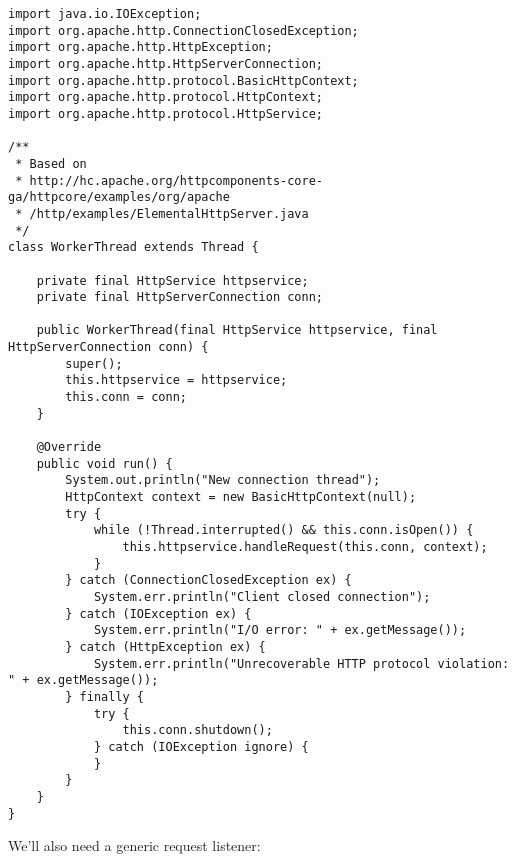 \begin{lstlisting}
import java.io.IOException;
import org.apache.http.ConnectionClosedException;
import org.apache.http.HttpException;
import org.apache.http.HttpServerConnection;
import org.apache.http.protocol.BasicHttpContext;
import org.apache.http.protocol.HttpContext;
import org.apache.http.protocol.HttpService;

/**
 * Based on
 * http://hc.apache.org/httpcomponents-core-ga/httpcore/examples/org/apache
 * /http/examples/ElementalHttpServer.java
 */
class WorkerThread extends Thread {

	private final HttpService httpservice;
	private final HttpServerConnection conn;

	public WorkerThread(final HttpService httpservice, final HttpServerConnection conn) {
		super();
		this.httpservice = httpservice;
		this.conn = conn;
	}

	@Override
	public void run() {
		System.out.println("New connection thread");
		HttpContext context = new BasicHttpContext(null);
		try {
			while (!Thread.interrupted() && this.conn.isOpen()) {
				this.httpservice.handleRequest(this.conn, context);
			}
		} catch (ConnectionClosedException ex) {
			System.err.println("Client closed connection");
		} catch (IOException ex) {
			System.err.println("I/O error: " + ex.getMessage());
		} catch (HttpException ex) {
			System.err.println("Unrecoverable HTTP protocol violation: " + ex.getMessage());
		} finally {
			try {
				this.conn.shutdown();
			} catch (IOException ignore) {
			}
		}
	}
}
\end{lstlisting}

\newpage
\noindent
We'll also need a generic request listener:

